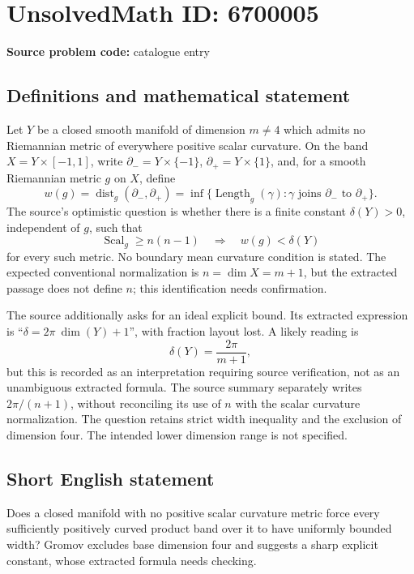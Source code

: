\documentclass[11pt]{article}
\begin{document}
\section*{UnsolvedMath ID: 6700005}
\textbf{Source problem code:} catalogue entry
\subsection{Definitions and mathematical statement}
Let \(Y\) be a closed smooth manifold of dimension \(m\ne4\) which admits no Riemannian metric of everywhere positive scalar curvature. On the band \(X=Y\times[-1,1]\), write \(\partial_-=Y\times\{-1\}\), \(\partial_+=Y\times\{1\}\), and, for a smooth Riemannian metric \(g\) on \(X\), define
\[
 w(g)=\operatorname{dist}_g(\partial_-,\partial_+)
 =\inf\{\operatorname{Length}_g(\gamma):\gamma\text{ joins }\partial_-\text{ to }\partial_+\}.
\]
The source's optimistic question is whether there is a finite constant \(\delta(Y)>0\), independent of \(g\), such that
\[
 \operatorname{Scal}_g\geq n(n-1)\quad\Longrightarrow\quad w(g)<\delta(Y)
\]
for every such metric. No boundary mean curvature condition is stated. The expected conventional normalization is \(n=\dim X=m+1\), but the extracted passage does not define \(n\); this identification needs confirmation.

The source additionally asks for an ideal explicit bound. Its extracted expression is ``\(\delta=2\pi\ \dim(Y)+1\)'', with fraction layout lost. A likely reading is
\[
 \delta(Y)=\frac{2\pi}{m+1},
\]
but this is recorded as an interpretation requiring source verification, not as an unambiguous extracted formula. The source summary separately writes \(2\pi/(n+1)\), without reconciling its use of \(n\) with the scalar curvature normalization. The question retains strict width inequality and the exclusion of dimension four. The intended lower dimension range is not specified.
\subsection{Short English statement}
Does a closed manifold with no positive scalar curvature metric force every sufficiently positively curved product band over it to have uniformly bounded width? Gromov excludes base dimension four and suggests a sharp explicit constant, whose extracted formula needs checking.
\end{document}
